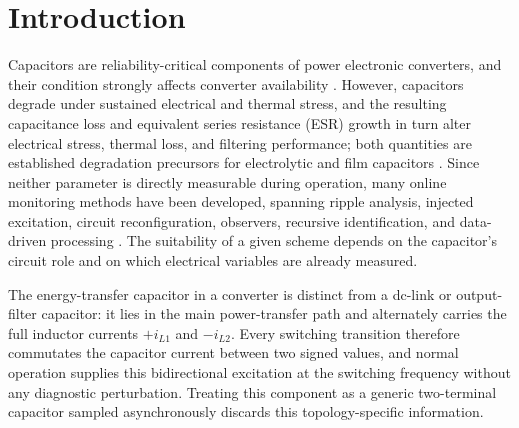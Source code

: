 \section{Introduction}
\label{sec:introduction}

Capacitors are reliability-critical components of power electronic converters, and their condition strongly affects converter availability \cite{wang2014reliability}. However, capacitors degrade under sustained electrical and thermal stress, and the resulting capacitance loss and equivalent series resistance (ESR) growth in turn alter electrical stress, thermal loss, and filtering performance; both quantities are established degradation precursors for electrolytic and film capacitors \cite{wang2014reliability,yao2024film}. Since neither parameter is directly measurable during operation, many online monitoring methods have been developed, spanning ripple analysis, injected excitation, circuit reconfiguration, observers, recursive identification, and data-driven processing \cite{dang2020review,nathan2023review,zhao2021overview}. The suitability of a given scheme depends on the capacitor's circuit role and on which electrical variables are already measured.

The energy-transfer capacitor in a \Cuk{} converter is distinct from a dc-link or output-filter capacitor: it lies in the main power-transfer path and alternately carries the full inductor currents $+i_{L1}$ and $-i_{L2}$. Every switching transition therefore commutates the capacitor current between two signed values, and normal operation supplies this bidirectional excitation at the switching frequency without any diagnostic perturbation. Treating this component as a generic two-terminal capacitor sampled asynchronously discards this topology-specific information.

